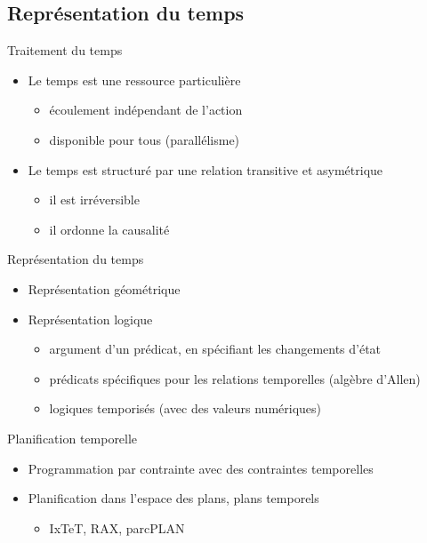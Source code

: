 \documentclass[compress]{beamer}
\begin{document}
\subsection{Représentation du temps}
\begin{frame}{Traitement du temps}
\begin{itemize}
\item Le temps est une ressource particulière
	\begin{itemize}
	\item écoulement indépendant de l'action
	\item disponible pour tous (parallélisme)
	\end{itemize}
\item Le temps est structuré par une relation transitive et asymétrique
	\begin{itemize}
	\item il est irréversible
	\item il ordonne la causalité
	\end{itemize}
\end{itemize}
\end{frame}

\begin{frame}{Représentation du temps}
\begin{itemize}
\item Représentation géométrique
\item Représentation logique
	\begin{itemize}
	\item argument d'un prédicat, en spécifiant les changements d'état
	\item prédicats spécifiques pour les relations temporelles (algèbre d'Allen)
	\item logiques temporisés (avec des valeurs numériques)
	\end{itemize}
\end{itemize}
\end{frame}

\begin{frame}{Planification temporelle}
\begin{itemize}
\item Programmation par contrainte avec des contraintes temporelles
\item Planification dans l'espace des plans, plans temporels
	\begin{itemize}
	\item IxTeT, RAX, parcPLAN
	\end{itemize}
\end{itemize}
\end{frame}
\end{document}
